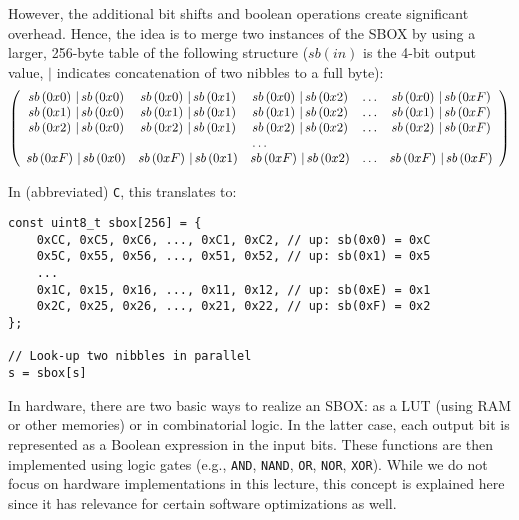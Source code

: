 However, the additional bit shifts and boolean operations create significant overhead. Hence, the idea is to merge two instances of the \ac{SBOX} by using a larger, 256-byte table of the following structure ($sb\left(in\right)$ is the 4-bit output value, $|$ indicates concatenation of two nibbles to a full byte):
$$
\left(\begin{array}[h!tbp]{c c c c c}
	sb\left(0x0\right)\,|\,sb\left(0x0\right) & sb\left(0x0\right)\,|\,sb\left(0x1\right) & sb\left(0x0\right)\,|\,sb\left(0x2\right) & \ldots & sb\left(0x0\right)\,|\,sb\left(0xF\right) \\
	sb\left(0x1\right)\,|\,sb\left(0x0\right) & sb\left(0x1\right)\,|\,sb\left(0x1\right) & sb\left(0x1\right)\,|\,sb\left(0x2\right) & \ldots & sb\left(0x1\right)\,|\,sb\left(0xF\right) \\
	sb\left(0x2\right)\,|\,sb\left(0x0\right) & sb\left(0x2\right)\,|\,sb\left(0x1\right) & sb\left(0x2\right)\,|\,sb\left(0x2\right) & \ldots & sb\left(0x2\right)\,|\,sb\left(0xF\right) \\
	\multicolumn{5}{c}{\ldots} \\
	sb\left(0xF\right)\,|\,sb\left(0x0\right) & sb\left(0xF\right)\,|\,sb\left(0x1\right) & sb\left(0xF\right)\,|\,sb\left(0x2\right) & \ldots & sb\left(0xF\right)\,|\,sb\left(0xF\right) \\
\end{array}\right)
$$

In (abbreviated) \verb+C+, this translates to:

\lstset{language=C}
\begin{lstlisting}
const uint8_t sbox[256] = { 
	0xCC, 0xC5, 0xC6, ..., 0xC1, 0xC2, // up: sb(0x0) = 0xC 
	0x5C, 0x55, 0x56, ..., 0x51, 0x52, // up: sb(0x1) = 0x5
	...
	0x1C, 0x15, 0x16, ..., 0x11, 0x12, // up: sb(0xE) = 0x1
	0x2C, 0x25, 0x26, ..., 0x21, 0x22, // up: sb(0xF) = 0x2
};

// Look-up two nibbles in parallel
s = sbox[s]
\end{lstlisting}

In hardware, there are two basic ways to realize an \ac{SBOX}: as a \ac{LUT} (using \ac{RAM} or other memories) or in combinatorial logic. In the latter case, each output bit is represented as a Boolean expression in the input bits. These functions are then implemented using logic gates (e.g., \verb+AND+, \verb+NAND+, \verb+OR+, \verb+NOR+, \verb+XOR+).  
While we do not focus on hardware implementations in this lecture, this concept is explained here since it has relevance for certain software optimizations as well.

